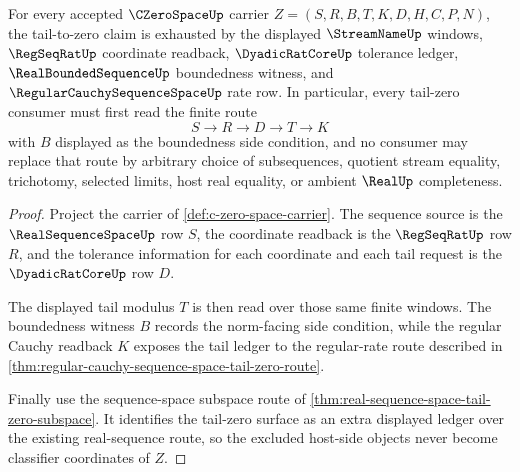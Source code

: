 \begin{theorem}
\label{thm:c-zero-space-tail-modulus-obligation}
For every accepted $\CZeroSpaceUp$ carrier $Z=(S,R,B,T,K,D,H,C,P,N)$, the tail-to-zero claim is exhausted by the displayed $\StreamNameUp$ windows, $\RegSeqRatUp$ coordinate readback, $\DyadicRatCoreUp$ tolerance ledger, $\RealBoundedSequenceUp$ boundedness witness, and $\RegularCauchySequenceSpaceUp$ rate row. In particular, every tail-zero consumer must first read the finite route
$$
S \longrightarrow R \longrightarrow D \longrightarrow T \longrightarrow K
$$
with $B$ displayed as the boundedness side condition, and no consumer may replace that route by arbitrary choice of subsequences, quotient stream equality, trichotomy, selected limits, host real equality, or ambient $\RealUp$ completeness.
\end{theorem}
\begin{proof}
Project the carrier of \autoref{def:c-zero-space-carrier}. The sequence source is the $\RealSequenceSpaceUp$ row $S$, the coordinate readback is the $\RegSeqRatUp$ row $R$, and the tolerance information for each coordinate and each tail request is the $\DyadicRatCoreUp$ row $D$.

The displayed tail modulus $T$ is then read over those same finite windows. The boundedness witness $B$ records the norm-facing side condition, while the regular Cauchy readback $K$ exposes the tail ledger to the regular-rate route described in \autoref{thm:regular-cauchy-sequence-space-tail-zero-route}.

Finally use the sequence-space subspace route of \autoref{thm:real-sequence-space-tail-zero-subspace}. It identifies the tail-zero surface as an extra displayed ledger over the existing real-sequence route, so the excluded host-side objects never become classifier coordinates of $Z$.
\end{proof}

